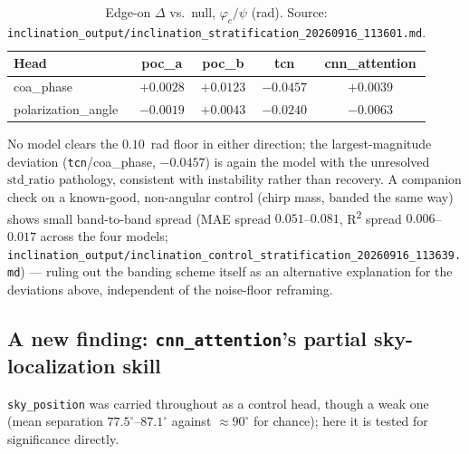 \begin{table}[tbp]
    \centering
    \caption{Edge-on $\Delta$ vs.\ null, $\varphi_c/\psi$ (rad). Source: \texttt{inclination\_output/inclination\_stratification\_20260916\_113601.md}.}
    \label{tab:phicpsi:redo:inclination}
    \small
    \begin{tabular}{@{}lcccc@{}}
        \toprule
        Head & poc\_a & poc\_b & tcn & cnn\_attention \\
        \midrule
        coa\_phase & $+0.0028$ & $+0.0123$ & $-0.0457$ & $+0.0039$ \\
        polarization\_angle & $-0.0019$ & $+0.0043$ & $-0.0240$ & $-0.0063$ \\
        \bottomrule
    \end{tabular}
\end{table}

No model clears the $0.10$~rad floor in either direction; the largest-magnitude deviation (\texttt{tcn}/coa\_phase, $-0.0457$) is again the model with the unresolved $\text{std\_ratio}$ pathology, consistent with instability rather than recovery.
A companion check on a known-good, non-angular control (chirp mass, banded the same way) shows small band-to-band spread (MAE spread $0.051$--$0.081$, R\textsuperscript{2} spread $0.006$--$0.017$ across the four models; \texttt{inclination\_output/inclination\_control\_stratification\_20260916\_113639.md}) --- ruling out the banding scheme itself as an alternative explanation for the deviations above, independent of the noise-floor reframing.

\subsection{A new finding: \texttt{cnn\_attention}'s partial sky-localization skill}
\label{sec:phicpsi:sky}

\texttt{sky\_position} was carried throughout as a control head, though a weak one (mean separation $77.5^\circ$--$87.1^\circ$ against $\approx 90^\circ$ for chance); here it is tested for significance directly.

